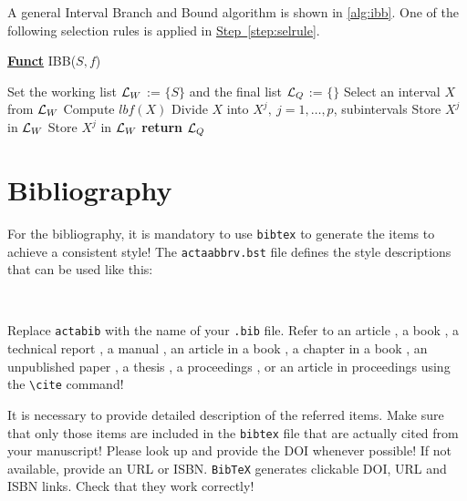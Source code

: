 \documentclass[withtitlethanks]{actacyb}
\begin{document}
A general Interval Branch and Bound algorithm is shown in \autoref{alg:ibb}. One of the following selection rules is applied in \hyperref[step:selrule]{Step~\ref{step:selrule}}.

\begin{algorithm}[ht!]
\caption{ A general interval B\&B algorithm.} 
\label{alg:ibb} 
\textbf{\underline{Funct}} IBB($S,f$)
\renewcommand{\algorithmiccomment}[1]{\hfill {\it #1}}
\begin{algorithmic}[1]
\STATE Set the working list ${\cal L}_W$ := $\{S\}$ and the final list ${\cal L}_Q$ := $\{\}$     
 \label{alg:igoend}
  \STATE  Select an interval $X$ from ${\cal L}_W$ \label{step:selrule}  
  \STATE Compute $lbf(X)$ 
    \STATE Divide $X$ into $X^j,\ j=1,\dots, p$, subintervals   
        \STATE Store $X^j$ in ${\cal L}_W$ 
      \ELSE
        \STATE Store $X^j$ in ${\cal L}_W$ 
      \ENDIF
    \ENDFOR  
  \ENDIF
\ENDWHILE
\STATE \textbf{return} ${\cal L}_Q$
\end{algorithmic}
\end{algorithm}


\section{Bibliography}
For the bibliography, it is mandatory to use \verb|bibtex| to generate the items to achieve a consistent style!
The \verb|actaabbrv.bst| file defines the style descriptions that can be used like this:

\begin{verbatim}


\end{verbatim}

Replace {\tt actabib} with the name of your {\tt .bib} file.
Refer to an article \cite{ratz99nonsmooth}, a book \cite{Klatte1993a}, a technical report \cite{ratz96optimized}, a manual \cite{T3D},
an article in a book \cite{Fuchi1996a}, a chapter in a book \cite{CORR96}, an unpublished paper \cite{jamartin}, a thesis \cite{braune-diss}, a proceedings \cite{griewank-proceedings}, or an article in proceedings \cite{alefeld-survey} using the \verb|\cite| command!

It is necessary to provide detailed description of the referred items.
Make sure that only those items are included in the \verb|bibtex| file that are actually cited from your manuscript!
Please look up and provide the DOI whenever possible! If not available, provide an URL or ISBN.
\verb|BibTeX| generates clickable DOI, URL and ISBN links. Check that they work correctly!

{


}
\end{document}
